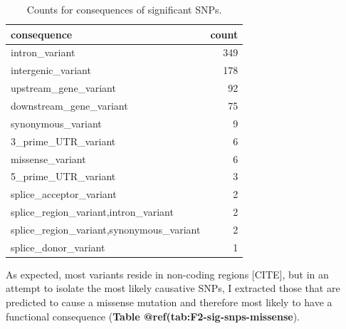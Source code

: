 \documentclass[
]{book}
\begin{document}
\begin{table}

\caption{\label{tab:F2-sig-snps-consq-counts}Counts for consequences of significant SNPs.}
\centering
\begin{tabular}[t]{l|r}
\hline
consequence & count\\
\hline
intron\_variant & 349\\
\hline
intergenic\_variant & 178\\
\hline
upstream\_gene\_variant & 92\\
\hline
downstream\_gene\_variant & 75\\
\hline
synonymous\_variant & 9\\
\hline
3\_prime\_UTR\_variant & 6\\
\hline
missense\_variant & 6\\
\hline
5\_prime\_UTR\_variant & 3\\
\hline
splice\_acceptor\_variant & 2\\
\hline
splice\_region\_variant,intron\_variant & 2\\
\hline
splice\_region\_variant,synonymous\_variant & 2\\
\hline
splice\_donor\_variant & 1\\
\hline
\end{tabular}
\end{table}

As expected, most variants reside in non-coding regions {[}CITE{]}, but in an attempt to isolate the most likely causative SNPs, I extracted those that are predicted to cause a missense mutation and therefore most likely to have a functional consequence (\textbf{Table @ref(tab:F2-sig-snps-missense}).
\end{document}
